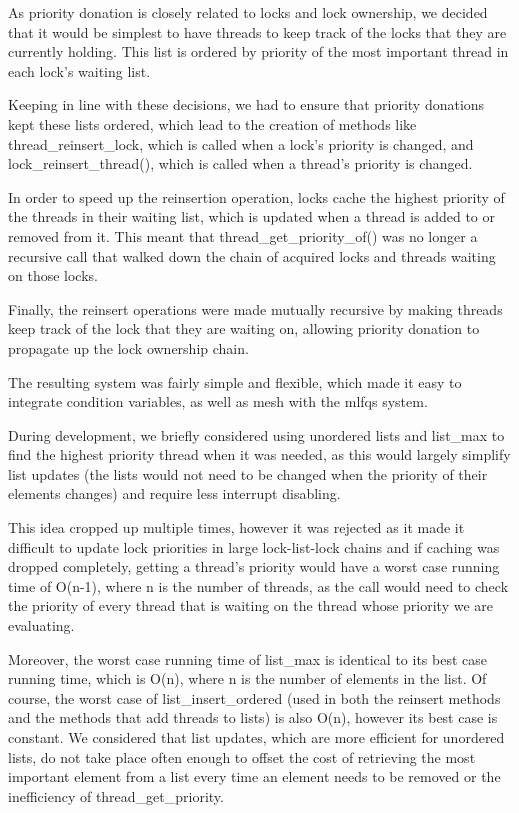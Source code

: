 As priority donation is closely related to locks and lock ownership, we decided that it would be simplest to have threads to keep track of the locks that they are currently holding. This list is ordered by priority of the most important thread in each lock's waiting list.

Keeping in line with these decisions, we had to ensure that priority donations kept these lists ordered, which lead to the creation of methods like thread_reinsert_lock, which is called when a lock's priority is changed, and lock_reinsert_thread(), which is called when a thread's priority is changed.

In order to speed up the reinsertion operation, locks cache the highest priority of the threads in their waiting list, which is updated when a thread is added to or removed from it. This meant that thread_get_priority_of() was no longer a recursive call that walked down the chain of acquired locks and threads waiting on those locks.

Finally, the reinsert operations were made mutually recursive by making threads keep track of the lock that they are waiting on, allowing priority donation to propagate up the lock ownership chain.

The resulting system was fairly simple and flexible, which made it easy to integrate condition variables, as well as mesh with the mlfqs system.


During development, we briefly considered using unordered lists and list_max to find the highest priority thread when it was needed, as this would largely simplify list updates (the lists would not need to be changed when the priority of their elements changes) and require less interrupt disabling.

This idea cropped up multiple times, however it was rejected as it made it difficult to update lock priorities in large lock-list-lock chains and if caching was dropped completely, getting a thread's priority would have a worst case running time of O(n-1), where n is the number of threads, as the call would need to check the priority of every thread that is waiting on the thread whose priority we are evaluating.

Moreover, the worst case running time of list_max is identical to its best case running time, which is O(n), where n is the number of elements in the list.
Of course, the worst case of list_insert_ordered (used in both the reinsert methods and the methods that add threads to lists) is also O(n), however its best case is constant.
We considered that list updates, which are more efficient for unordered lists, do not take place often enough to offset the cost of retrieving the most important element from a list every time an element needs to be removed or the inefficiency of thread_get_priority.

